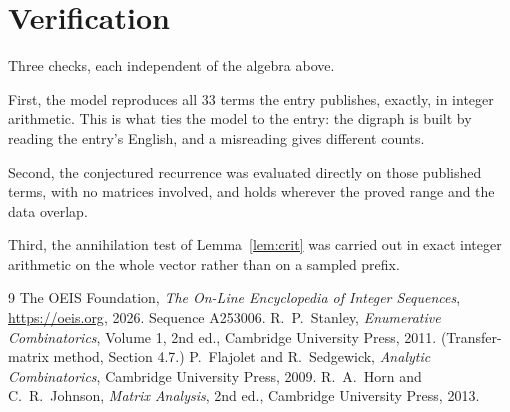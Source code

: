 \documentclass[11pt,a4paper]{article}
\theoremstyle{plain}
\theoremstyle{definition}
\begin{document}
\section{Verification}

Three checks, each independent of the algebra above.

First, the model reproduces all $33$ terms the entry publishes, exactly, in integer
arithmetic. This is what ties the model to the entry: the digraph is built by reading the
entry's English, and a misreading gives different counts.

Second, the conjectured recurrence was evaluated directly on those published terms, with no
matrices involved, and holds wherever the proved range and the data overlap.

Third, the annihilation test of Lemma~\ref{lem:crit} was carried out in exact integer
arithmetic on the whole vector rather than on a sampled prefix.

\begin{thebibliography}{9}
 The OEIS Foundation, \emph{The On-Line Encyclopedia of Integer
Sequences}, \url{https://oeis.org}, 2026. Sequence A253006.
 R.~P.~Stanley, \emph{Enumerative Combinatorics}, Volume 1, 2nd ed.,
Cambridge University Press, 2011. (Transfer-matrix method, Section 4.7.)
 P.~Flajolet and R.~Sedgewick, \emph{Analytic Combinatorics}, Cambridge
University Press, 2009.
 R.~A.~Horn and C.~R.~Johnson, \emph{Matrix Analysis}, 2nd ed., Cambridge
University Press, 2013.
\end{thebibliography}
\end{document}
